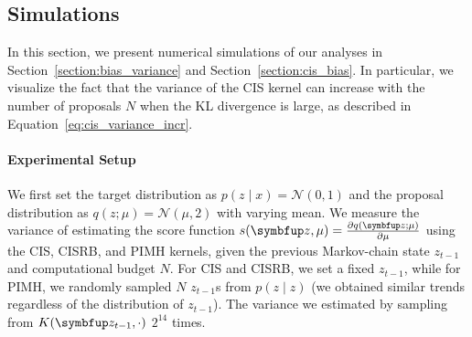 
\subsection{Simulations}
In this section, we present numerical simulations of our analyses in Section~\ref{section:bias_variance} and Section~\ref{section:cis_bias}.
In particular, we visualize the fact that the variance of the CIS kernel can increase with the number of proposals \(N\) when the KL divergence is large, as described in Equation~\eqref{eq:cis_variance_incr}.

\paragraph{Experimental Setup}
We first set the target distribution as \(p(z \mid x) = \mathcal{N}(0, 1)\) and the proposal distribution as \(q(z; \mu) = \mathcal{N}(\mu, 2)\) with varying mean.
We measure the variance of estimating the score function \(s(\vz, \mu) = \frac{\partial q(\vz; \mu)}{\partial \mu} \) using the CIS, CISRB, and PIMH kernels, given the previous Markov-chain state \(z_{t-1}\) and computational budget \(N\).
For CIS and CISRB, we set a fixed \(z_{t-1}\), while for PIMH, we randomly sampled \(N\) \(z_{t-1}\)s from \(p(z \mid z)\) (we obtained similar trends regardless of the distribution of \(z_{t-1}\)).
The variance we estimated by sampling from \(K(\vz_{t-1}, \cdot)\) \(2^{14}\) times.

